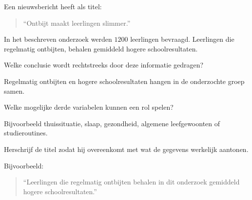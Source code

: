 \documentclass{ximera}
\begin{document}
\begin{oefening}{\oefU \ESS}

Een nieuwsbericht heeft als titel:

\begin{quote}
``Ontbijt maakt leerlingen slimmer.''
\end{quote}

In het beschreven onderzoek werden $1200$ leerlingen bevraagd.
Leerlingen die regelmatig ontbijten, behalen gemiddeld hogere
schoolresultaten.

\begin{question}
Welke conclusie wordt rechtstreeks door deze informatie gedragen?

\begin{oplossing}
Regelmatig ontbijten en hogere schoolresultaten hangen in de onderzochte
groep samen.
\end{oplossing}
\end{question}

\begin{question}
Welke mogelijke derde variabelen kunnen een rol spelen?

\begin{oplossing}
Bijvoorbeeld thuissituatie, slaap, gezondheid, algemene leefgewoonten
of studieroutines.
\end{oplossing}
\end{question}

\begin{question}
Herschrijf de titel zodat hij overeenkomt met wat de gegevens werkelijk
aantonen.

\begin{oplossing}
Bijvoorbeeld:
\begin{quote}
``Leerlingen die regelmatig ontbijten behalen in dit onderzoek
gemiddeld hogere schoolresultaten.''
\end{quote}
\end{oplossing}
\end{question}

\end{oefening}
\end{document}
